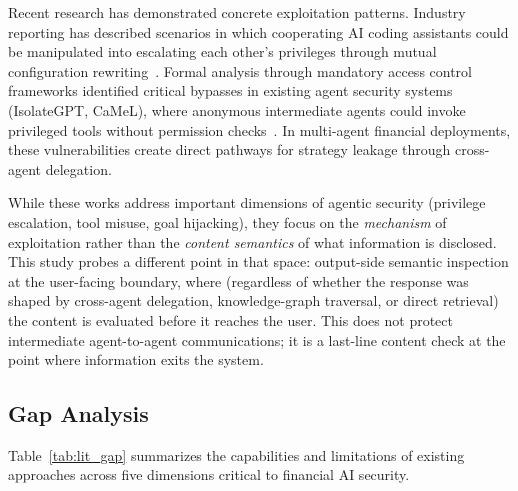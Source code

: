\documentclass[journal]{IEEEtran}
\begin{document}
Recent research has demonstrated concrete exploitation patterns. Industry reporting has described scenarios in which cooperating AI coding assistants could be manipulated into escalating each other's privileges through mutual configuration rewriting~\cite{sombra_llm_security_2026}. Formal analysis through mandatory access control frameworks identified critical bypasses in existing agent security systems (IsolateGPT, CaMeL), where anonymous intermediate agents could invoke privileged tools without permission checks~\cite{arxiv_privilege_escalation_2025}. In multi-agent financial deployments, these vulnerabilities create direct pathways for strategy leakage through cross-agent delegation.

While these works address important dimensions of agentic security (privilege escalation, tool misuse, goal hijacking), they focus on the \textit{mechanism} of exploitation rather than the \textit{content semantics} of what information is disclosed. This study probes a different point in that space: output-side semantic inspection at the user-facing boundary, where (regardless of whether the response was shaped by cross-agent delegation, knowledge-graph traversal, or direct retrieval) the content is evaluated before it reaches the user. This does not protect intermediate agent-to-agent communications; it is a last-line content check at the point where information exits the system.

\subsection{Gap Analysis}
\label{Sect:LR_Gap}

Table~\ref{tab:lit_gap} summarizes the capabilities and limitations of existing approaches across five dimensions critical to financial AI security.
\end{document}
